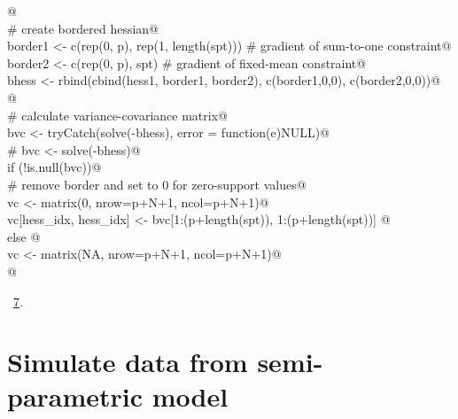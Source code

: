 \documentclass[reqno]{amsart}
\renewcommand{\NWlink}[2]{\hyperlink{#1}{#2}}
\begin{document}
\begin{flushleft}
\begin{list}{}{}
\mbox{}\verb@  @\\
\mbox{}\verb@  # create bordered hessian@\\
\mbox{}\verb@  border1 <- c(rep(0, p), rep(1, length(spt)))  # gradient of sum-to-one constraint@\\
\mbox{}\verb@  border2 <- c(rep(0, p), spt)          # gradient of fixed-mean constraint@\\
\mbox{}\verb@  bhess <- rbind(cbind(hess1, border1, border2), c(border1,0,0), c(border2,0,0))@\\
\mbox{}\verb@  @\\
\mbox{}\verb@  # calculate variance-covariance matrix@\\
\mbox{}\verb@  bvc <- tryCatch(solve(-bhess), error = function(e)NULL)@\\
\mbox{}\verb@  # bvc <- solve(-bhess)@\\
\mbox{}\verb@  if (!is.null(bvc)){@\\
\mbox{}\verb@    # remove border and set to 0 for zero-support values@\\
\mbox{}\verb@    vc <- matrix(0, nrow=p+N+1, ncol=p+N+1)@\\
\mbox{}\verb@    vc[hess_idx, hess_idx] <- bvc[1:(p+length(spt)), 1:(p+length(spt))]     @\\
\mbox{}\verb@  } else {@\\
\mbox{}\verb@    vc <- matrix(NA, nrow=p+N+1, ncol=p+N+1)@\\
\mbox{}\verb@  }@\\
\mbox{}\verb@@{\NWsep}
\end{list}
\vspace{-1.5ex}
\footnotesize
\begin{list}{}{\setlength{\itemsep}{-\parsep}\setlength{\itemindent}{-\leftmargin}}
\item \NWtxtMacroRefIn\ \NWlink{nuweb7}{7}.

\item{}
\end{list}
\vspace{4ex}
\end{flushleft}
\section{Simulate data from semi-parametric model}
\end{document}
